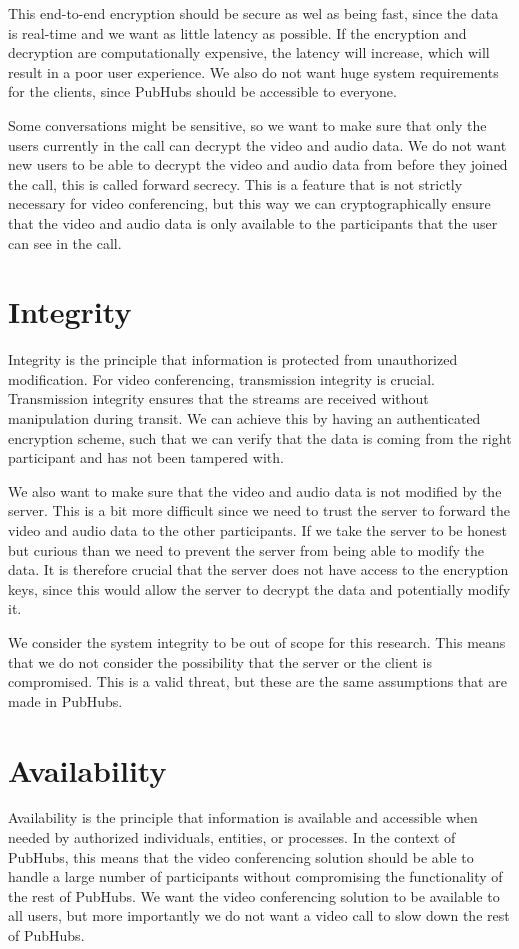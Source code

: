 \documentclass{report}
\begin{document}
This end-to-end encryption should be secure as wel as being fast, since the data is real-time and we want as little
latency as possible. If the encryption and decryption are computationally expensive, the latency will increase,
which will result in a poor user experience. We also do not want huge system requirements for the clients, since
PubHubs should be accessible to everyone.

Some conversations might be sensitive, so we want to make sure that only the users currently in the call can
decrypt the video and audio data. We do not want new users to be able to decrypt the video and audio data from
before they joined the call, this is called forward secrecy. This is a feature that is not strictly necessary for
video conferencing, but this way we can cryptographically ensure that the video and audio data is only available to
the participants that the user can see in the call.

\section{Integrity}
Integrity is the principle that information is protected from unauthorized modification. For video conferencing, transmission integrity
is crucial. Transmission integrity ensures that the streams are received without manipulation during transit.
We can achieve this by having an authenticated encryption scheme, such that we can verify that the data is coming from
the right participant and has not been tampered with.

We also want to make sure that the video and audio data is not modified by the server. This is a bit more difficult
since we need to trust the server to forward the video and audio data to the other participants. If we take the server
to be honest but curious than we need to prevent the server from being able to modify the data. It is therefore crucial
that the server does not have access to the encryption keys, since this would allow the server to decrypt the data and
potentially modify it.

We consider the system integrity to be out of scope for this research. This means that we do not consider the
possibility that the server or the client is compromised. This is a valid threat, but these are the same assumptions
that are made in PubHubs.

\section{Availability}
Availability is the principle that information is available and accessible when needed by authorized individuals,
entities, or processes. In the context of PubHubs, this means that the video conferencing solution should be able to
handle a large number of participants without compromising the functionality of the rest of PubHubs. We want the
video conferencing solution to be available to all users, but more importantly we do not want a video call to slow
down the rest of PubHubs.
\end{document}
